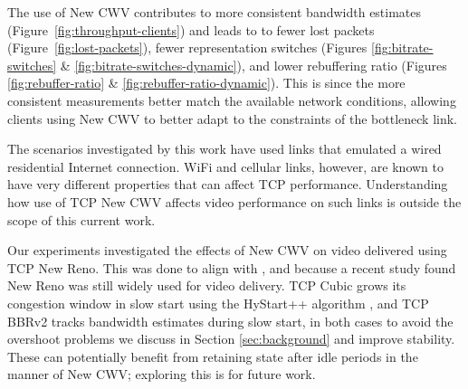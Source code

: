 \documentclass[10pt,sigconf]{acmart}
\begin{document}

The use of New CWV contributes to more consistent bandwidth estimates (Figure~\ref{fig:throughput-clients}) and leads to to fewer lost packets (Figure~\ref{fig:lost-packets}), fewer representation switches (Figures \ref{fig:bitrate-switches} \& \ref{fig:bitrate-switches-dynamic}), and lower rebuffering ratio (Figures \ref{fig:rebuffer-ratio} \& \ref{fig:rebuffer-ratio-dynamic}).
This is since the more consistent measurements better match the available network conditions, allowing clients using New CWV to better adapt to the constraints of the bottleneck link. 

The scenarios investigated by this work have used links that emulated a wired
residential Internet connection.  WiFi and cellular links, however, are known
to have very different properties that can affect TCP performance. Understanding
how use of TCP New CWV affects video performance on such links is outside the
scope of this current work.

Our experiments investigated the effects of New CWV on video delivered
using TCP New Reno. This was done to align with
\cite{Nazir-2014-performance-evaluation-congestion-window-validation-dash-newcwv},
and because a recent study \cite{Mishra-2019-the-great-internet-tcp-congestion-control-census}
found New Reno was still widely used for video delivery.
%
TCP Cubic grows its congestion window in slow start using the HyStart++
algorithm \cite{draft-ietf-tcpm-hystartplusplus}, and TCP BBRv2 tracks
bandwidth estimates during slow start, in both cases to avoid the overshoot
problems we discuss in Section \ref{sec:background} and improve stability.
These can potentially benefit from retaining state after idle periods in
the manner of New CWV; exploring this is for future work.
\end{document}
